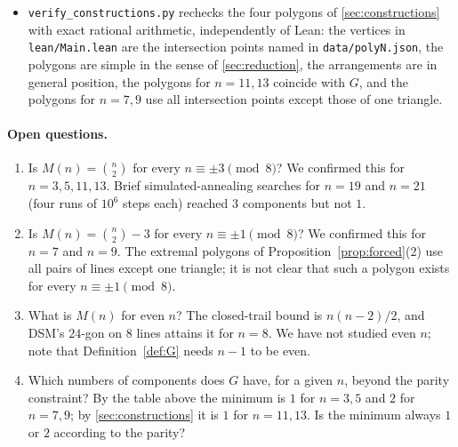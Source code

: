 \begin{itemize}
  statement of Lemma~\ref{lem:percycle} on random reduced words of $w_0$, for every odd $n\le23$
  ($3000$ words for $n\le13$, $500$ words for $15\le n\le23$). No violation occurred. The smallest numbers
  of components seen were $6,8,9,9,12$ for $n=15,17,19,21,23$.
\item \texttt{verify\_constructions.py} rechecks the four polygons of \cref{sec:constructions} with exact
  rational arithmetic, independently of Lean: the vertices in \texttt{lean/Main.lean} are the intersection
  points named in \texttt{data/polyN.json}, the polygons are simple in the sense of \cref{sec:reduction},
  the arrangements are in general position, the polygons for $n=11,13$ coincide with $G$, and the
  polygons for $n=7,9$ use all intersection points except those of one triangle.
\end{itemize}

\paragraph{Open questions.}
\begin{enumerate}
\item Is $M(n)=\binom n2$ for every $n\equiv\pm3\pmod 8$? We confirmed this for $n=3,5,11,13$. Brief
  simulated-annealing searches for $n=19$ and $n=21$ (four runs of $10^6$ steps each) reached $3$
  components but not $1$.
\item Is $M(n)=\binom n2-3$ for every $n\equiv\pm1\pmod 8$? We confirmed this for $n=7$ and $n=9$. The
  extremal polygons of Proposition~\ref{prop:forced}(2) use all pairs of lines except one triangle; it is
  not clear that such a polygon exists for every $n\equiv\pm1\pmod 8$.
\item What is $M(n)$ for even $n$? The closed-trail bound is $n(n-2)/2$, and DSM's $24$-gon on $8$
  lines attains it for $n=8$. We have not studied even $n$; note that Definition~\ref{def:G} needs $n-1$
  to be even.
\item Which numbers of components does $G$ have, for a given $n$, beyond the parity constraint? By the
  table above the minimum is $1$ for $n=3,5$ and $2$ for $n=7,9$; by \cref{sec:constructions} it is $1$
  for $n=11,13$. Is the minimum always $1$ or $2$ according to the parity?
\end{enumerate}

